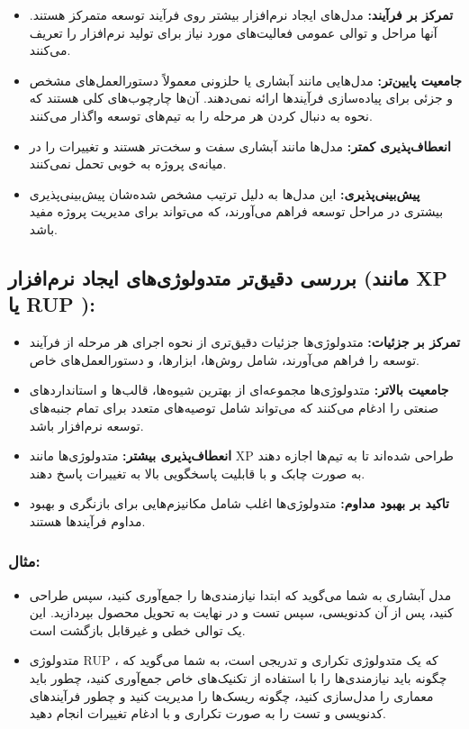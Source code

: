 \begin{itemize}
	\item \textbf{تمرکز بر فرآیند:} مدل‌های ایجاد نرم‌افزار بیشتر روی فرآیند توسعه متمرکز هستند. آنها مراحل و توالی عمومی فعالیت‌های مورد نیاز برای تولید نرم‌افزار را تعریف می‌کنند.
	\item \textbf{جامعیت پایین‌تر:} مدل‌هایی مانند آبشاری یا حلزونی معمولاً دستورالعمل‌های مشخص و جزئی برای پیاده‌سازی فرآیندها ارائه نمی‌دهند. آن‌ها چارچوب‌های کلی هستند که نحوه به دنبال کردن هر مرحله را به تیم‌های توسعه واگذار می‌کنند.
	\item \textbf{انعطاف‌پذیری کمتر:} مدل‌ها مانند آبشاری سفت و سخت‌تر هستند و تغییرات را در میانه‌ی پروژه به خوبی تحمل نمی‌کنند.
	\item \textbf{پیش‌بینی‌پذیری:} این مدل‌ها به دلیل ترتیب مشخص شده‌شان پیش‌بینی‌پذیری بیشتری در مراحل توسعه فراهم می‌آورند، که می‌تواند برای مدیریت پروژه مفید باشد.
\end{itemize}

\subsection*{بررسی دقیق‌تر متدولوژی‌های ایجاد نرم‌افزار (مانند XP یا RUP ):}

\begin{itemize}
	\item \textbf{تمرکز بر جزئیات:} متدولوژی‌ها جزئیات دقیق‌تری از نحوه اجرای هر مرحله از فرآیند توسعه را فراهم می‌آورند، شامل روش‌ها، ابزارها، و دستورالعمل‌های خاص.
	\item \textbf{جامعیت بالاتر:} متدولوژی‌ها مجموعه‌ای از بهترین شیوه‌ها، قالب‌ها و استانداردهای صنعتی را ادغام می‌کنند که می‌تواند شامل توصیه‌های متعدد برای تمام جنبه‌های توسعه نرم‌افزار باشد.
	\item \textbf{انعطاف‌پذیری بیشتر:} متدولوژی‌ها مانند XP طراحی شده‌اند تا به تیم‌ها اجازه دهند به صورت چابک و با قابلیت پاسخگویی بالا به تغییرات پاسخ دهند.
	\item \textbf{تاکید بر بهبود مداوم:} متدولوژی‌ها اغلب شامل مکانیزم‌هایی برای بازنگری و بهبود مداوم فرآیندها هستند.
\end{itemize}

\subsubsection*{مثال:}

\begin{itemize}
	\item مدل آبشاری به شما می‌گوید که ابتدا نیازمندی‌ها را جمع‌آوری کنید، سپس طراحی کنید، پس از آن کدنویسی، سپس تست و در نهایت به تحویل محصول بپردازید. این یک توالی خطی و غیرقابل بازگشت است.
	\item متدولوژی RUP ، که یک متدولوژی تکراری و تدریجی است، به شما می‌گوید که چگونه باید نیازمندی‌ها را با استفاده از تکنیک‌های خاص جمع‌آوری کنید، چطور باید معماری را مدل‌سازی کنید، چگونه ریسک‌ها را مدیریت کنید و چطور فرآیندهای کدنویسی و تست را به صورت تکراری و با ادغام تغییرات انجام دهید.
\end{itemize}

